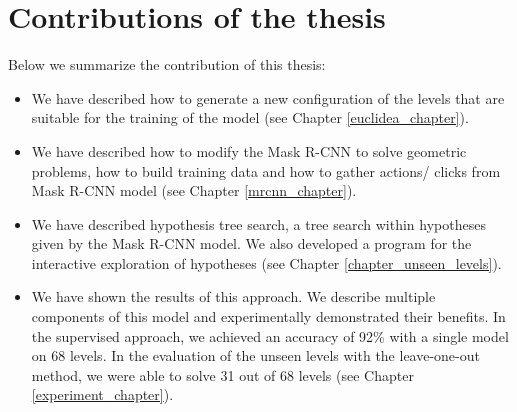 \section{Contributions of the thesis}
Below we summarize the contribution of this thesis:
\begin{itemize}
    \item We have described how to generate a new configuration of the levels that are suitable for the training of the model (see Chapter \ref{euclidea_chapter}).
    \item We have described how to modify the Mask {R-CNN} to solve geometric problems, how to build training data and how to gather actions/ clicks from Mask {R-CNN} model (see Chapter \ref{mrcnn_chapter}).
    \item We have described hypothesis tree search, a tree search within hypotheses given by the Mask {R-CNN} model. We also developed a program for the interactive exploration of hypotheses (see Chapter \ref{chapter_unseen_levels}).
    \item We have shown the results of this approach. We describe multiple components of this model and experimentally demonstrated their benefits. In the supervised approach, we achieved an accuracy of 92\% with a single model on 68 levels. In the evaluation of the unseen levels with the leave-one-out method, we were able to solve 31 out of 68 levels (see Chapter \ref{experiment_chapter}). 
    
\end{itemize}
